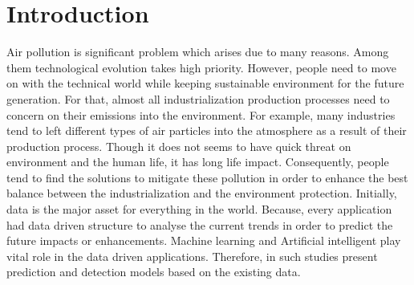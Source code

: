 \section{Introduction}\label{sec-intro}








Air pollution is significant problem which arises due to many reasons.
Among them technological evolution takes high priority.
However, people need to move on with the technical world 
while keeping sustainable environment for the future generation.
For that, almost all industrialization production processes need 
to concern on their emissions into the environment.
For example, many industries tend to left different types of air 
particles into the atmosphere as a result of their production process.
Though it does not seems to have quick threat on environment and the human life,
it has long life impact. Consequently, people tend to find the solutions to 
mitigate these pollution in order to enhance the best balance between 
the industrialization and the environment protection. 
Initially, data is the major asset for everything in the world.
Because, every application had data driven structure to analyse the current trends 
in order to predict the future impacts or enhancements.
Machine learning and Artificial intelligent play vital role in the data driven applications. 
Therefore, in such studies present prediction and detection models based on the existing data.

